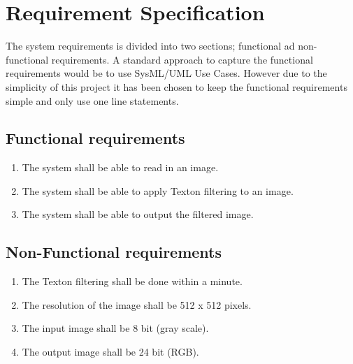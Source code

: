 \chapter{Requirement Specification}
The system requirements is divided into two sections; functional ad non-functional requirements. A standard approach to capture the functional requirements would be to use SysML/UML Use Cases. However due to the simplicity of this project it has been chosen to keep the functional requirements simple and only use one line statements. 

\section{Functional requirements}
\begin{enumerate}[label=1.\arabic*]
	\item The system shall be able to read in an image.
	\item The system shall be able to apply Texton filtering to an image.
	\item The system shall be able to output the filtered image.
\end{enumerate}


\section{Non-Functional requirements}
\begin{enumerate}[label=2.\arabic*]
	\item The Texton filtering shall be done within a minute.
	\label{req:timeReq}
	\item The resolution of the image shall be 512 x 512 pixels.
	\item The input image shall be 8 bit (gray scale).
	\item The output image shall be 24 bit (RGB).
\end{enumerate}